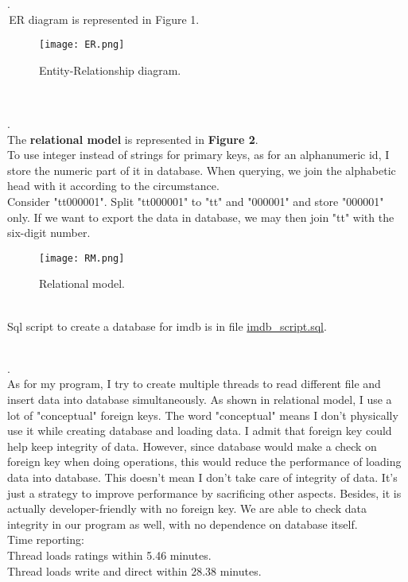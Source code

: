 \documentclass[a4paper]{article}
\begin{document}
\par
{}.\\\,ER diagram is represented in Figure 1.
\begin{figure}[ht]
\centering
\texttt{[image: ER.png]}
\caption{Entity-Relationship diagram.}
\label{fig:label}
\end{figure}
\\
\par
{}.\\
The \textbf{relational model} is represented in \textbf{Figure 2}.\\
To use integer instead of strings for primary keys, as for an alphanumeric id, I store the numeric part of it in database. When querying, we join the alphabetic head with it according to the circumstance.\\
Consider "tt000001". Split "tt000001" to "tt" and "000001" and store "000001" only. If we want to export the data in database, we may then join "tt" with the six-digit number.
\begin{figure}[ht]
\centering
\texttt{[image: RM.png]}
\caption{Relational model.}
\label{fig:label}
\end{figure}\\
Sql script to create a database for imdb is in file \href{run:./imdb\_script.sql}{imdb\_script.sql}.
\\\\
\par
{}.\\
As for my program, I try to create multiple threads to read different file and insert data into database simultaneously. As shown in relational model, I use a lot of "conceptual" foreign keys. The word "conceptual" means I don't physically use it while creating database and loading data. I admit that foreign key could help keep integrity of data. However, since database would make a check on foreign key when doing operations, this would reduce the performance of loading data into database. This doesn't mean I don't take care of integrity of data. It's just a strategy to improve performance by sacrificing other aspects. Besides, it is actually developer-friendly with no foreign key. We are able to check data integrity in our program as well, with no dependence on database itself.\\
Time reporting:\\
Thread loads ratings within 5.46 minutes.\\
Thread loads write and direct within 28.38 minutes.\\
\end{document}
